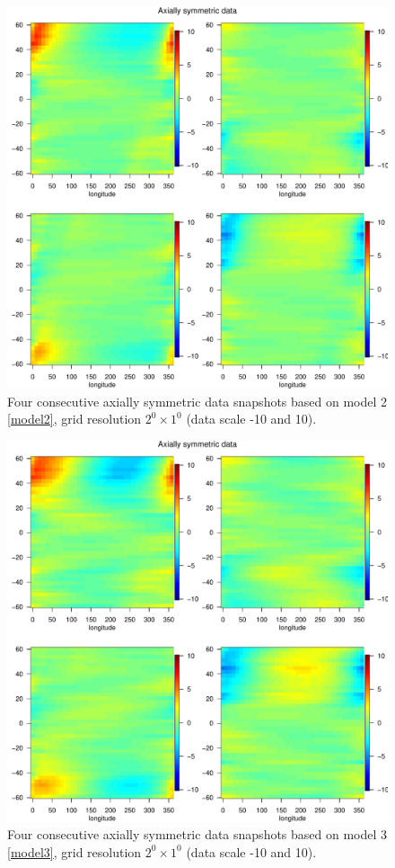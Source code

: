 \begin{figure}[H]
	\label{grid_plot_model2}
	\begin{center}
		\includegraphics [scale=.8]{graphs/Data_sample_120_model2.pdf}
		\caption*{Four consecutive axially symmetric data snapshots based on model 2 \eqref{model2}, grid resolution $2^0\times 1^0$ (data scale -10 and 10).}
	\end{center}
\end{figure}


\begin{figure}[H]
\label{grid_plot_model3}
\begin{center}
\includegraphics [scale=.8]{graphs/Data_sample_120_model3.pdf}
\caption*{Four consecutive axially symmetric data snapshots based on model 3 \eqref{model3}, grid resolution $2^0\times 1^0$ (data scale -10 and 10).}
\end{center}
\end{figure}
